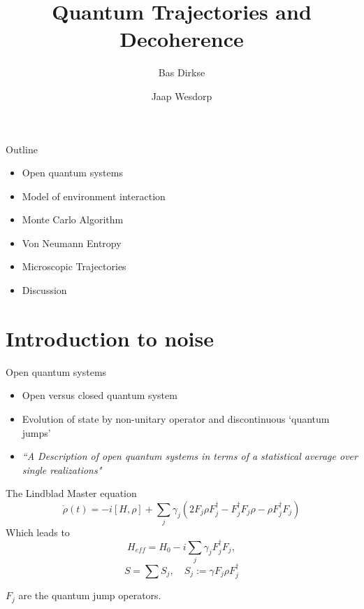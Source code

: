 \documentclass{beamer}
\title[]{Quantum Trajectories and Decoherence}
\institute[]{Delft University of Technology, The Netherlands}
\author{Bas Dirkse \and Jaap Wesdorp}
\begin{document}
{
\frame{\titlepage}
}

{

}

\begin{frame}{Outline}
\begin{itemize}
	\item Open quantum systems
	\item Model of environment interaction
	\item Monte Carlo Algorithm
	\item Von Neumann Entropy
	\item Microscopic Trajectories
	\item Discussion
\end{itemize}
\end{frame}

\section{Introduction to noise}
\begin{frame}{Open quantum systems}
	\begin{itemize}
		\item Open versus closed quantum system
		\item Evolution of state by non-unitary operator and discontinuous `quantum jumps'
		\item 	\emph{``A Description of open quantum systems in terms of a statistical average over single realizations"}
	\end{itemize}
\end{frame}
	
\begin{frame}{The Lindblad Master equation}
	$$
	\dot{\rho}(t) = -i [H,\rho] + \sum_j  \gamma_j ( 2 F_j \rho F_j^\dagger - F_j^\dagger F_j \rho - \rho F_j^\dagger F_j  )
	$$
Which leads to
$$
H_{eff} = H_0 - i \sum_j \gamma_j F_j^\dagger F_j, 
$$
$$
S = \sum S_j, \quad S_j := \gamma F_j \rho F_j^\dagger
$$

$F_j$ are the quantum jump operators.
\end{frame}
\end{document}
